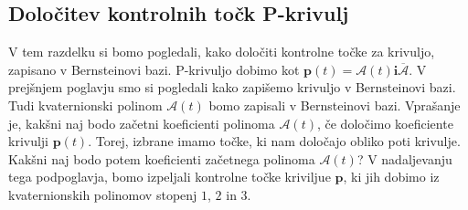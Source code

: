 \documentclass[mat1]{fmfdelo}
\newcommand{\ii}{\boldsymbol i}
\newcommand{\pp}{\boldsymbol p}
\newcommand{\A}{\mathcal A}
\begin{document}
\subsection{Določitev kontrolnih točk P-krivulj}
V tem razdelku si bomo pogledali, kako določiti kontrolne točke za krivuljo, zapisano v Bernsteinovi bazi. P-krivuljo dobimo kot $\pp(t)=\A(t)\ii\overline{\A}$. V prejšnjem poglavju smo si pogledali kako zapišemo krivuljo v Bernsteinovi bazi. Tudi kvaternionski polinom $\A(t)$ bomo zapisali v Bernsteinovi bazi. Vprašanje je, kakšni naj bodo začetni koeficienti polinoma $\A(t)$, če določimo koeficiente krivulji $\pp(t)$. Torej, izbrane imamo točke, ki nam določajo obliko poti krivulje. Kakšni naj bodo potem koeficienti začetnega polinoma $\A(t)$? V nadaljevanju tega podpoglavja, bomo izpeljali kontrolne točke kriviljue $\pp$, ki jih dobimo iz kvaternionskih polinomov stopenj $1$, $2$ in $3$.
\end{document}
